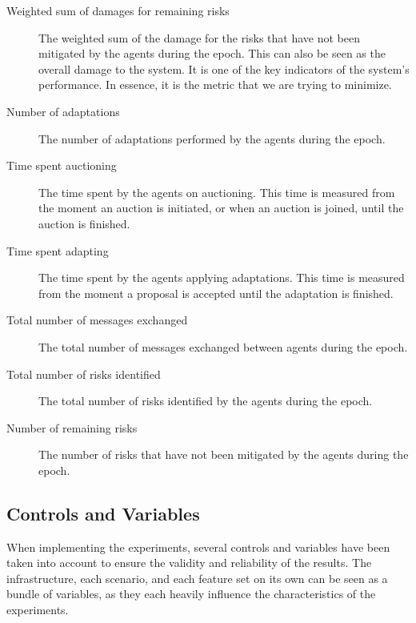 \begin{description}
    \item[Weighted sum of damages for remaining risks] The weighted sum of the damage for the risks that have not been mitigated by the agents during the epoch. This can also be seen as the overall damage to the system. It is one of the key indicators of the system's performance. In essence, it is the metric that we are trying to minimize. 
    \item[Number of adaptations] The number of adaptations performed by the agents during the epoch.
    \item[Time spent auctioning] The time spent by the agents on auctioning. This time is measured from the moment an auction is initiated, or when an auction is joined, until the auction is finished. 
    \item[Time spent adapting] The time spent by the agents applying adaptations. This time is measured from the moment a proposal is accepted until the adaptation is finished.
    \item[Total number of messages exchanged] The total number of messages exchanged between agents during the epoch.
    \item[Total number of risks identified] The total number of risks identified by the agents during the epoch.
    \item[Number of remaining risks] The number of risks that have not been mitigated by the agents during the epoch.
\end{description}

\subsection{Controls and Variables}
\label{ssec:controls-variables}

When implementing the experiments, several controls and variables have been taken into account to ensure the validity and reliability of the results. The infrastructure, each scenario, and each feature set on its own can be seen as a bundle of variables, as they each heavily influence the characteristics of the experiments. 

